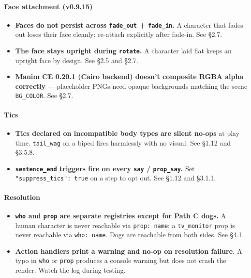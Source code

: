 \documentclass[
  11pt,
]{book}
\providecommand{\tightlist}{%
  \setlength{\itemsep}{0pt}\setlength{\parskip}{0pt}}
\begin{document}
\paragraph{Face attachment (v0.9.15)}\label{face-attachment-v0.9.15}

\begin{itemize}
\tightlist
\item
  \textbf{Faces do not persist across \texttt{fade\_out} +
  \texttt{fade\_in}.} A character that fades out loses their face
  cleanly; re-attach explicitly after fade-in. See §2.7.
\item
  \textbf{The face stays upright during \texttt{rotate}.} A character
  laid flat keeps an upright face by design. See §2.5 and §2.7.
\item
  \textbf{Manim CE 0.20.1 (Cairo backend) doesn't composite RGBA alpha
  correctly} --- placeholder PNGs need opaque backgrounds matching the
  scene \texttt{BG\_COLOR}. See §2.7.
\end{itemize}

\paragraph{Tics}\label{tics}

\begin{itemize}
\tightlist
\item
  \textbf{Tics declared on incompatible body types are silent no-ops} at
  play time. \texttt{tail\_wag} on a biped fires harmlessly with no
  visual. See §1.12 and §3.5.8.
\item
  \textbf{\texttt{sentence\_end} triggers fire on every \texttt{say} /
  \texttt{prop\_say}.} Set \texttt{"suppress\_tics":\ true} on a step to
  opt out. See §1.12 and §3.1.1.
\end{itemize}

\paragraph{Resolution}\label{resolution}

\begin{itemize}
\tightlist
\item
  \textbf{\texttt{who} and \texttt{prop} are separate registries except
  for Path C dogs.} A human character is never reachable via
  \texttt{prop:\ name}; a \texttt{tv\_monitor} prop is never reachable
  via \texttt{who:\ name}. Dogs are reachable from both sides. See §4.1.
\item
  \textbf{Action handlers print a warning and no-op on resolution
  failure.} A typo in \texttt{who} or \texttt{prop} produces a console
  warning but does not crash the render. Watch the log during testing.
\end{itemize}
\end{document}

